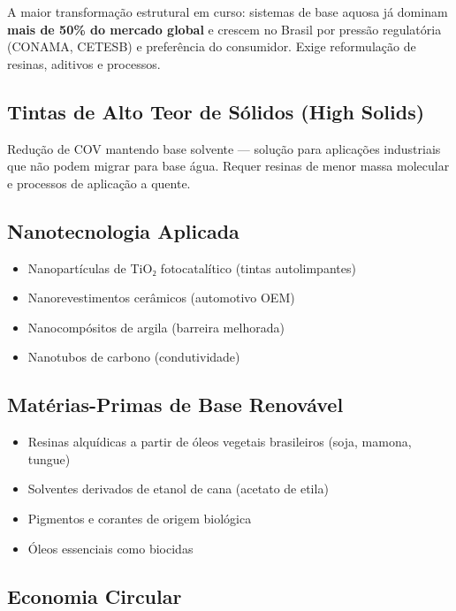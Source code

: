 \documentclass[
  12pt,
  a4paper,
  oneside,
  brazil,
  chapter=TITLE
]{article}
\begin{document}
A maior transformação estrutural em curso: sistemas de base aquosa já
dominam \textbf{mais de 50\% do mercado global} e crescem no Brasil por
pressão regulatória (CONAMA, CETESB) e preferência do consumidor. Exige
reformulação de resinas, aditivos e processos.

\subsection{Tintas de Alto Teor de Sólidos (High
Solids)}\label{tintas-de-alto-teor-de-suxf3lidos-high-solids}

Redução de COV mantendo base solvente --- solução para aplicações
industriais que não podem migrar para base água. Requer resinas de menor
massa molecular e processos de aplicação a quente.

\subsection{Nanotecnologia Aplicada}\label{nanotecnologia-aplicada}

\begin{itemize}
\tightlist
\item
  Nanopartículas de TiO₂ fotocatalítico (tintas autolimpantes)
\item
  Nanorevestimentos cerâmicos (automotivo OEM)
\item
  Nanocompósitos de argila (barreira melhorada)
\item
  Nanotubos de carbono (condutividade)
\end{itemize}

\subsection{Matérias-Primas de Base
Renovável}\label{matuxe9rias-primas-de-base-renovuxe1vel}

\begin{itemize}
\tightlist
\item
  Resinas alquídicas a partir de óleos vegetais brasileiros (soja,
  mamona, tungue)
\item
  Solventes derivados de etanol de cana (acetato de etila)
\item
  Pigmentos e corantes de origem biológica
\item
  Óleos essenciais como biocidas
\end{itemize}

\subsection{Economia Circular}\label{economia-circular}
\end{document}

